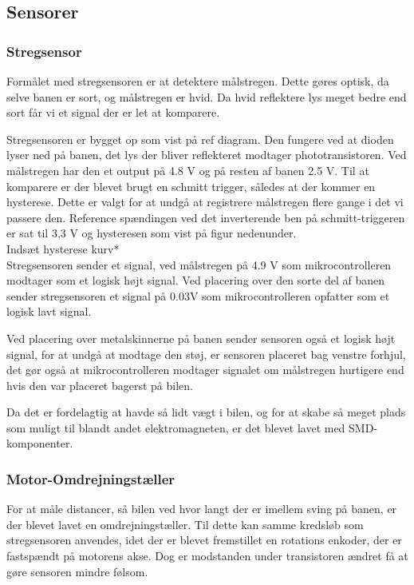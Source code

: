
\subsection{Sensorer}


\subsubsection{Stregsensor}
Formålet med stregsensoren er at detektere målstregen. Dette gøres optisk, da selve banen er sort, og målstregen er hvid. Da hvid reflektere lys meget bedre end sort får vi et signal der er let at komparere.

Stregsensoren er bygget op som vist på ref diagram. Den fungere ved at dioden lyser ned på banen, det lys der bliver reflekteret modtager phototransistoren. Ved målstregen har den et output på 4.8 V og på resten af banen 2.5 V. Til at komparere er der blevet brugt en schmitt trigger, således at der kommer en hysterese. Dette er valgt for at undgå at registrere målstregen flere gange i det vi passere den. Reference spændingen ved det inverterende ben på schmitt-triggeren er sat til 3,3 V og hysteresen som vist på figur nedenunder.
\\
Indsæt hysterese kurv*
\\
Stregsensoren sender et signal, ved målstregen på 4.9 V som  mikrocontrolleren modtager som et logisk højt signal. Ved placering over den sorte del af banen sender stregsensoren et signal på 0.03V som mikrocontrolleren opfatter som et logisk lavt signal. 

Ved placering over metalskinnerne på banen sender sensoren også et logisk højt signal, for at undgå at modtage den støj, er sensoren placeret bag venstre forhjul, det gør også at mikrocontrolleren modtager signalet om målstregen hurtigere end hvis den var placeret bagerst på bilen. 

Da det er fordelagtig at havde så lidt vægt i bilen, og for at skabe så meget plads som muligt til blandt andet elektromagneten, er det blevet lavet med SMD-komponenter. 


\subsubsection{Motor-Omdrejningstæller}

For at måle distancer, så bilen ved hvor langt der er imellem sving på banen, er der blevet lavet en omdrejningstæller. Til dette kan samme kredsløb som stregsensoren anvendes, idet der er blevet fremstillet en rotations enkoder, der er fastspændt på motorens akse. Dog er modstanden under transistoren ændret få at gøre sensoren mindre følsom.   



